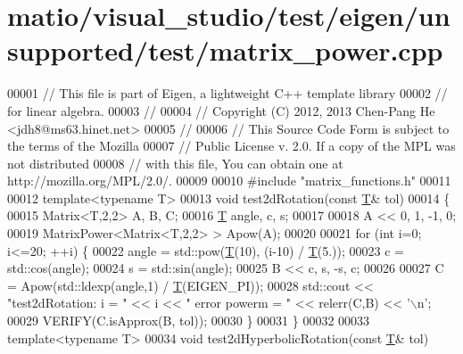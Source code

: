 \hypertarget{matio_2visual__studio_2test_2eigen_2unsupported_2test_2matrix__power_8cpp_source}{}\section{matio/visual\+\_\+studio/test/eigen/unsupported/test/matrix\+\_\+power.cpp}
\label{matio_2visual__studio_2test_2eigen_2unsupported_2test_2matrix__power_8cpp_source}

\begin{DoxyCode}
00001 \textcolor{comment}{// This file is part of Eigen, a lightweight C++ template library}
00002 \textcolor{comment}{// for linear algebra.}
00003 \textcolor{comment}{//}
00004 \textcolor{comment}{// Copyright (C) 2012, 2013 Chen-Pang He <jdh8@ms63.hinet.net>}
00005 \textcolor{comment}{//}
00006 \textcolor{comment}{// This Source Code Form is subject to the terms of the Mozilla}
00007 \textcolor{comment}{// Public License v. 2.0. If a copy of the MPL was not distributed}
00008 \textcolor{comment}{// with this file, You can obtain one at http://mozilla.org/MPL/2.0/.}
00009 
00010 \textcolor{preprocessor}{#include "matrix\_functions.h"}
00011 
00012 \textcolor{keyword}{template}<\textcolor{keyword}{typename} T>
00013 \textcolor{keywordtype}{void} test2dRotation(\textcolor{keyword}{const} \hyperlink{group___sparse_core___module_class_eigen_1_1_triplet}{T}& tol)
00014 \{
00015   Matrix<T,2,2> A, B, C;
00016   \hyperlink{group___sparse_core___module_class_eigen_1_1_triplet}{T} angle, c, s;
00017 
00018   A << 0, 1, -1, 0;
00019   MatrixPower<Matrix<T,2,2> > Apow(A);
00020 
00021   \textcolor{keywordflow}{for} (\textcolor{keywordtype}{int} i=0; i<=20; ++i) \{
00022     angle = std::pow(\hyperlink{group___sparse_core___module_class_eigen_1_1_triplet}{T}(10), (i-10) / \hyperlink{group___sparse_core___module_class_eigen_1_1_triplet}{T}(5.));
00023     c = std::cos(angle);
00024     s = std::sin(angle);
00025     B << c, s, -s, c;
00026 
00027     C = Apow(std::ldexp(angle,1) / \hyperlink{group___sparse_core___module_class_eigen_1_1_triplet}{T}(EIGEN\_PI));
00028     std::cout << \textcolor{stringliteral}{"test2dRotation: i = "} << i << \textcolor{stringliteral}{"   error powerm = "} << relerr(C,B) << \textcolor{charliteral}{'\(\backslash\)n'};
00029     VERIFY(C.isApprox(B, tol));
00030   \}
00031 \}
00032 
00033 \textcolor{keyword}{template}<\textcolor{keyword}{typename} T>
00034 \textcolor{keywordtype}{void} test2dHyperbolicRotation(\textcolor{keyword}{const} \hyperlink{group___sparse_core___module_class_eigen_1_1_triplet}{T}& tol)

\end{DoxyCode}
